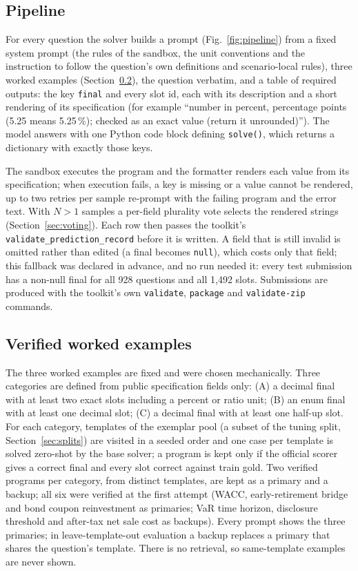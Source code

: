 \documentclass[conference]{IEEEtran}
\newcommand{\id}[1]{\texttt{#1}}
\begin{document}
\subsection{Pipeline}
For every question the solver builds a prompt (Fig.~\ref{fig:pipeline}) from a fixed system prompt (the rules of the sandbox, the unit conventions and the instruction to follow the question's own definitions and scenario-local rules), three worked examples (Section~\ref{sec:exemplars}), the question verbatim, and a table of required outputs: the key \id{final} and every slot id, each with its description and a short rendering of its specification (for example ``number in percent, percentage points (5.25 means 5.25\,\%); checked as an exact value (return it unrounded)''). The model answers with one Python code block defining \id{solve()}, which returns a dictionary with exactly those keys.

The sandbox executes the program and the formatter renders each value from its specification; when execution fails, a key is missing or a value cannot be rendered, up to two retries per sample re-prompt with the failing program and the error text. With $N>1$ samples a per-field plurality vote selects the rendered strings (Section~\ref{sec:voting}). Each row then passes the toolkit's \id{validate\_prediction\_record} before it is written. A field that is still invalid is omitted rather than edited (a final becomes \id{null}), which costs only that field; this fallback was declared in advance, and no run needed it: every test submission has a non-null final for all 928 questions and all 1,492 slots. Submissions are produced with the toolkit's own \id{validate}, \id{package} and \id{validate-zip} commands.

\subsection{Verified worked examples}\label{sec:exemplars}
The three worked examples are fixed and were chosen mechanically. Three categories are defined from public specification fields only: (A) a decimal final with at least two exact slots including a percent or ratio unit; (B) an enum final with at least one decimal slot; (C) a decimal final with at least one half-up slot. For each category, templates of the exemplar pool (a subset of the tuning split, Section~\ref{sec:splits}) are visited in a seeded order and one case per template is solved zero-shot by the base solver; a program is kept only if the official scorer gives a correct final and every slot correct against train gold. Two verified programs per category, from distinct templates, are kept as a primary and a backup; all six were verified at the first attempt (WACC, early-retirement bridge and bond coupon reinvestment as primaries; VaR time horizon, disclosure threshold and after-tax net sale cost as backups). Every prompt shows the three primaries; in leave-template-out evaluation a backup replaces a primary that shares the question's template. There is no retrieval, so same-template examples are never shown.
\end{document}
